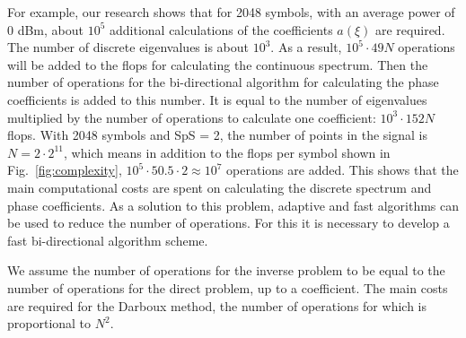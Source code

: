 For example, our research shows that for 2048 symbols, with an average power of 0 dBm, about $10^5$ additional calculations of the coefficients $a(\xi)$ are required. The number of discrete eigenvalues is about $10^3$. As a result, $10^5 \cdot 49 N$ operations will be added to the \acrshort{flop}s for calculating the continuous spectrum. Then the number of operations for the bi-directional algorithm for calculating the phase coefficients is added to this number. It is equal to the number of eigenvalues multiplied by the number of operations to calculate one coefficient: $10^3 \cdot 152 N$ \acrshort{flop}s. With 2048 symbols and SpS = 2, the number of points in the signal is $N = 2 \cdot 2^{11}$, which means in addition to the \acrshort{flop}s per symbol shown in Fig.~\ref{fig:complexity}, $10^5 \cdot 50.5 \cdot 2 \approx 10^7$ operations are added. This shows that the main computational costs are spent on calculating the discrete spectrum and phase coefficients. As a solution to this problem, adaptive and fast algorithms can be used to reduce the number of operations. For this it is necessary to develop a fast bi-directional algorithm scheme.

We assume the number of operations for the inverse problem to be equal to the number of operations for the direct problem, up to a coefficient. The main costs are required for the Darboux method, the number of operations for which is proportional to $N^2$.


